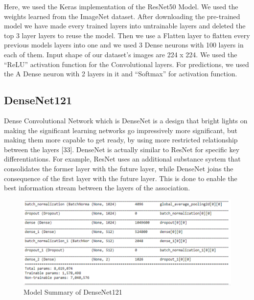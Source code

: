 \vspace{5mm}
\noindent Here, we used the Keras implementation of the ResNet50 Model. We used the weights learned from the ImageNet dataset. After downloading the pre-trained model we have made every trained layers into untrainable layers and deleted the top 3 layer layers to reuse the model. Then we use a Flatten layer to flatten every previous models layers into one and we used 3 Dense neurons with 100 layers in each of them. Input shape of our dataset's images are 224 x 224. We used the “ReLU” activation function for the Convolutional layers. For predictions, we used the A Dense neuron with 2 layers in it and “Softmax” for activation function. 



\subsection{DenseNet121}
Dense Convolutional Network which is DenseNet is a design that bright lights on making the significant learning networks go impressively more significant, but making them more capable to get ready, by using more restricted relationship between the layers [33]. DenseNet is actually similar to ResNet for specific key differentiations. For example, ResNet uses an additional substance system that consolidates the former layer with the future layer, while DenseNet joins the consequence of the first layer with the future layer. This is done to enable the best information stream between the layers of the association.

\vspace{5mm}
\begin{figure}[hbt!]
\centering
\includegraphics[scale=0.5]{images/fig-15.png}
\caption{Model Summary of DenseNet121}
\label{fig:x Model Summary of DenseNet121}
\end{figure}
\vspace{5mm}

